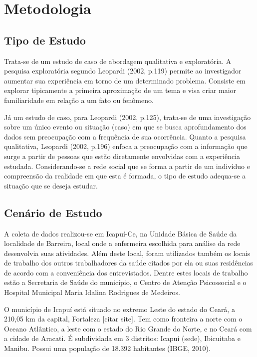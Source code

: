 \chapter{Metodologia}
\label{chap:metodologia}

\section{Tipo de Estudo}
Trata-se de um estudo de caso de abordagem qualitativa e exploratória. A pesquisa exploratória segundo Leopardi (2002, p.119) permite ao investigador aumentar sua experiência em torno de um determinado problema. Consiste em explorar tipicamente a primeira aproximação de um tema e visa criar maior familiaridade em relação a um fato ou fenômeno. 

Já um estudo de caso, para Leopardi (2002, p.125), trata-se de uma investigação sobre um único evento ou situação (caso) em que se busca aprofundamento dos dados  sem preocupação com a frequência de sua ocorrência. Quanto a pesquisa qualitativa, Leopardi (2002, p.196) enfoca a preocupação com a informação que surge a partir de pessoas que estão diretamente envolvidas com a experiência estudada. Considerando-se a rede social que se forma a partir de um indivíduo e compreensão da realidade em que esta é formada, o tipo de estudo adequa-se a situação que se deseja estudar.

\section{Cenário de Estudo}
A coleta de dados realizou-se em Icapuí-Ce, na Unidade Básica de Saúde da localidade de Barreira, local onde a enfermeira escolhida para análise da rede desenvolvia suas atividades. Além deste local, foram utilizados também os locais de trabalho dos outros trabalhadores da saúde citados por ela ou suas residências de acordo com a conveniência dos entrevistados. Dentre estes locais de trabalho estão a Secretaria de Saúde do município, o Centro de Atenção Psicossocial e o Hospital Municipal Maria Idalina Rodrigues de Medeiros. 

O município de Icapuí está situado no extremo Leste do estado do Ceará, a 210,05 km da capital, Fortaleza [citar site]. Tem como fronteira a norte com o Oceano Atlântico, a leste com o estado do Rio Grande do Norte, e no Ceará com a cidade de Aracati. É subdividada em 3 distritos: Icapuí (sede), Ibicuitaba e Manibu. Possui uma população de 18.392 habitantes (IBGE, 2010).
  
